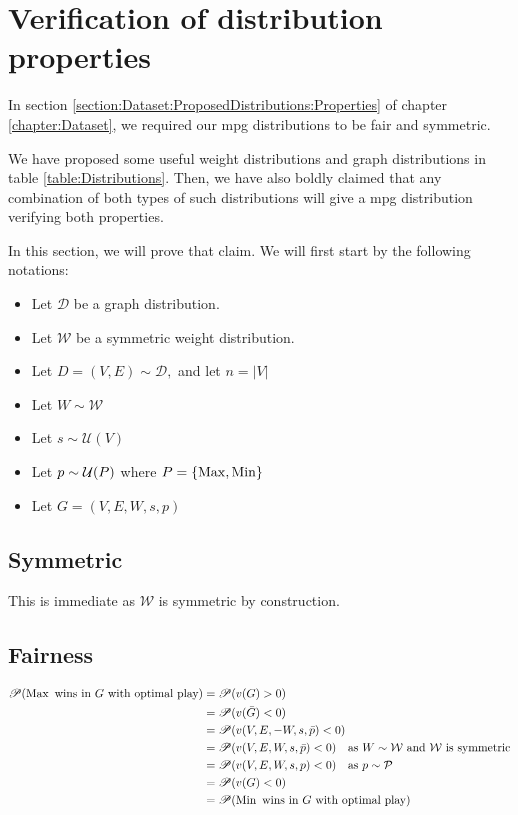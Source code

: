\section{Verification of distribution properties}
In section \ref{section:Dataset:ProposedDistributions:Properties} of chapter \ref{chapter:Dataset}, we required our \acrshort{mpg} distributions to be fair and symmetric.

We have proposed some useful weight distributions and graph distributions in table \ref{table:Distributions}. Then, we have also boldly claimed that any combination of both types of such distributions will give a \acrshort{mpg} distribution verifying both properties.

In this section, we will prove that claim. We will first start by the following notations:
\begin{itemize}
	\item Let $\mathcal{D}$ be a graph distribution.
	\item Let $\mathcal{W}$ be a symmetric weight distribution. 
	\item Let $D=(V,E)\sim \mathcal{D},$ and let $n=\lvert V \rvert$
	\item Let $W\sim \mathcal{W}$
	\item Let $s\sim \mathcal{U}(V)$
	\item Let $p\sim \mathcal{U}(P)$ where $P=\{\operatorname{Max},\operatorname{Min}\}$
	\item Let $G=(V,E,W,s,p)$
\end{itemize}

\subsection{Symmetric}
This is immediate as $\mathcal{W}$ is symmetric by construction.
\subsection{Fairness}
\begin{align*}
	\mathscr{P}(\operatorname{Max} \ \text{wins in} \ G \ \text{with optimal play}) &=
	\mathscr{P}(v(G) > 0)  \\ 
	&= \mathscr{P}(v(\bar{G})<0) \\
	&= \mathscr{P}(v(V,E,-W,s,\bar{p})<0) \\
	&= \mathscr{P}(v(V,E,W,s,\bar{p})<0) \quad \text{as} \ W\sim \mathcal{W} \ \text{and}\ \mathcal{W} \ \text{is symmetric} \\  
	&= \mathscr{P}(v(V,E,W,s,p)<0) \quad \text{as} \ p \sim \mathcal{P} \\
	&=\mathscr{P}(v(G)<0) \\
		&=\mathscr{P}(\operatorname{Min} \ \text{wins in} \ G \ \text{with optimal play}) 
\end{align*} 
